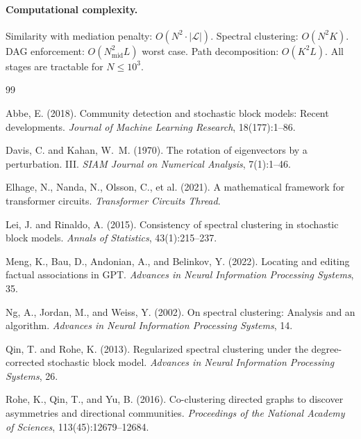 \documentclass[11pt]{article}
\newcommand{\1}{\mathbbm{1}}
\begin{document}
\paragraph{Computational complexity.}
Similarity with mediation penalty: $O(N^2 \cdot |\mathcal{L}|)$.
Spectral clustering: $O(N^2 K)$.
DAG enforcement: $O(N_{\mathrm{mid}}^2 L)$ worst case.
Path decomposition: $O(K^2 L)$.
All stages are tractable for $N \le 10^3$.


\begin{thebibliography}{99}

Abbe, E. (2018).
\newblock Community detection and stochastic block models: Recent developments.
\newblock \emph{Journal of Machine Learning Research}, 18(177):1--86.

Davis, C. and Kahan, W.~M. (1970).
\newblock The rotation of eigenvectors by a perturbation. III.
\newblock \emph{SIAM Journal on Numerical Analysis}, 7(1):1--46.

Elhage, N., Nanda, N., Olsson, C., et al. (2021).
\newblock A mathematical framework for transformer circuits.
\newblock \emph{Transformer Circuits Thread}.

Lei, J. and Rinaldo, A. (2015).
\newblock Consistency of spectral clustering in stochastic block models.
\newblock \emph{Annals of Statistics}, 43(1):215--237.

Meng, K., Bau, D., Andonian, A., and Belinkov, Y. (2022).
\newblock Locating and editing factual associations in {GPT}.
\newblock \emph{Advances in Neural Information Processing Systems}, 35.

Ng, A., Jordan, M., and Weiss, Y. (2002).
\newblock On spectral clustering: Analysis and an algorithm.
\newblock \emph{Advances in Neural Information Processing Systems}, 14.

Qin, T. and Rohe, K. (2013).
\newblock Regularized spectral clustering under the degree-corrected stochastic block model.
\newblock \emph{Advances in Neural Information Processing Systems}, 26.

Rohe, K., Qin, T., and Yu, B. (2016).
\newblock Co-clustering directed graphs to discover asymmetries and directional communities.
\newblock \emph{Proceedings of the National Academy of Sciences}, 113(45):12679--12684.


\end{thebibliography}
\end{document}
